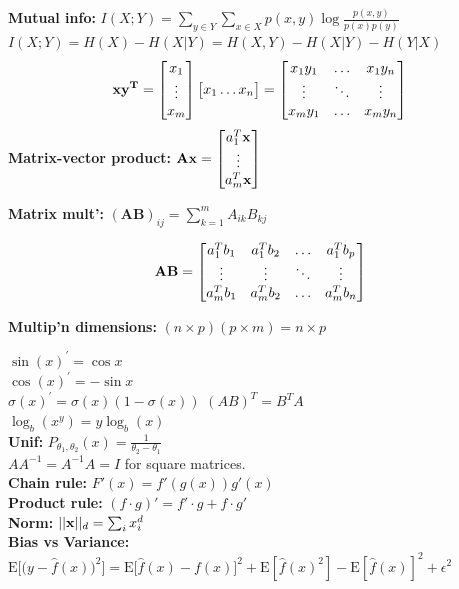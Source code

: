 {\bf Mutual info: } $I(X;Y) = \sum_{y \in Y}\sum_{x \in X} p(x,y) \log \frac{p(x, y)}{p(x)p(y)}$\\
$I(X;Y) = H(X) - H(X \vert Y) = H(X, Y) - H(X \vert Y) - H(Y \vert X)$
$$\mathbf{xy^T} = \begin{bmatrix}
           x_{1} \\
           \vdots \\
           x_{m}
         \end{bmatrix}      
         \begin{bmatrix}
           x_{1}\hdots x_{n}
         \end{bmatrix} = \begin{bmatrix}
         x_1 y_1 & \hdots & x_1 y_n \\
         \vdots & \ddots  & \vdots \\
          x_m y_1 & \hdots & x_m y_n \\
         \end{bmatrix}
         $$
{\bf Matrix-vector product: } $ \mathbf{Ax} = \begin{bmatrix}
 	a_1^T\mathbf{x}\\
	\vdots \\
	a_m^T\mathbf{x}
	\end{bmatrix}
$

{\bf Matrix mult': } $ (\mathbf{A}\mathbf{B})_{ij} = \sum_{k=1}^m A_{ik}B_{kj}\,$

$$ \mathbf{AB} =  \begin{bmatrix}
         a_1^Tb_1&  a_1^T b_2 & \hdots & a_1^T b_p \\
         \vdots & \vdots  & \ddots  & \vdots \\
          a_m^T b_1 & a_m^T b_2 & \hdots & a_m^T b_n \\
         \end{bmatrix}
$$

{\bf Multip'n dimensions: } $(n \times p)(p \times m) = n \times p$

$\sin(x)^{'} = \cos{x}$ \\
$\cos(x)^{'} = -\sin{x}$\\
$\sigma(x)^{'} = \sigma(x)(1-\sigma(x))$
$(AB)^{T} = B^{T}A$\\
$\log_{b}(x^{y}) = y \log_{b}(x)$\\
{\bf Unif: } $P_{\theta_1, \theta_2}(x) = \frac{1}{\theta_2 - \theta_1}$ \\
$AA^{-1} = A^{-1}A = I$ for square matrices. \\
{\bf Chain rule: } $F'(x) = f'(g(x)) g'(x)$ \\
{\bf Product rule: } $(f\cdot g)'=f'\cdot g+f\cdot g' \,\!$ \\
{\bf Norm: } $\vert \vert \mathbf{x} \vert \vert_{d} = \sum_{i} x_{i}^{d}$ \\
{\bf Bias vs Variance: } $\mathrm{E}\Big[\big(y - \hat{f}(x)\big)^2\Big] = \mathrm{E}\big[\hat{f}(x) - f(x)\big]^2 + \mathrm{E}[\hat{f}(x)^2] - \mathrm{E}[\hat{f}(x)]^2 + \epsilon^2$

